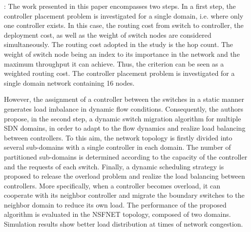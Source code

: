 \documentclass[a4paper,10pt]{article}
\begin{document}
\cite{YaHo15}: The work presented in this paper encompasses two steps. In a first step, the controller placement problem is investigated for a single domain, i.e. where only one controller exists. In this case, the routing cost from switch to controller, the deployment cost, as well as the weight of switch nodes are considered simultaneously. The routing cost adopted in the study is the hop count. The weight of switch node being an index to its importance in the network and the maximum throughput it can achieve. Thus, the criterion can be seen as a weighted routing cost. The controller placement problem is investigated for a single domain network containing 16 nodes.

However, the assignment of a controller between the switches in a static manner generates load imbalance in dynamic flow conditions. Consequently, the authors propose, in the second step, a dynamic switch migration algorithm for multiple SDN domains, in order to adapt to the flow dynamics and realize load balancing between controllers. To this aim, the network topology is firstly divided into several sub-domains with a single controller in each domain. The number of partitioned sub-domains is determined according to the capacity of the controller and the requests of each switch. Finally, a dynamic scheduling strategy is proposed to release the overload problem and realize the load balancing between controllers. More specifically, when a controller becomes overload, it can cooperate with its neighbor controller and migrate the boundary switches to the neighbor domain to reduce its own load. The performance of the proposed algorithm is evaluated in the NSFNET topology, composed of two domains. Simulation results show better load distribution at times of network congestion.
\end{document}
